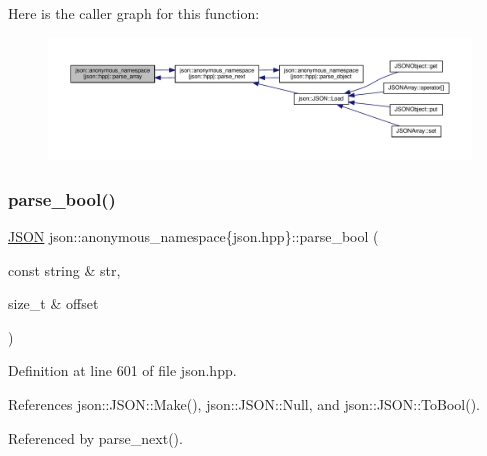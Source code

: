Here is the caller graph for this function\+:
\nopagebreak
\begin{figure}[H]
\begin{center}
\leavevmode
\includegraphics[width=350pt]{namespacejson_1_1anonymous__namespace_02json_8hpp_03_a6a3598f1545d6015c9db8015fc42f7ff_icgraph}
\end{center}
\end{figure}
\mbox{\label{namespacejson_1_1anonymous__namespace_02json_8hpp_03_ae47f0a41d47e83e2ce1f5f267e938c1e}} 
\subsubsection{\texorpdfstring{parse\+\_\+bool()}{parse\_bool()}}
{\footnotesize\ttfamily \mbox{\hyperlink{classjson_1_1_j_s_o_n}{J\+S\+ON}} json\+::anonymous\+\_\+namespace\{json.\+hpp\}\+::parse\+\_\+bool (\begin{DoxyParamCaption}\item[{const string \&}]{str,  }\item[{size\+\_\+t \&}]{offset }\end{DoxyParamCaption})}



Definition at line 601 of file json.\+hpp.



References json\+::\+J\+S\+O\+N\+::\+Make(), json\+::\+J\+S\+O\+N\+::\+Null, and json\+::\+J\+S\+O\+N\+::\+To\+Bool().



Referenced by parse\+\_\+next().



